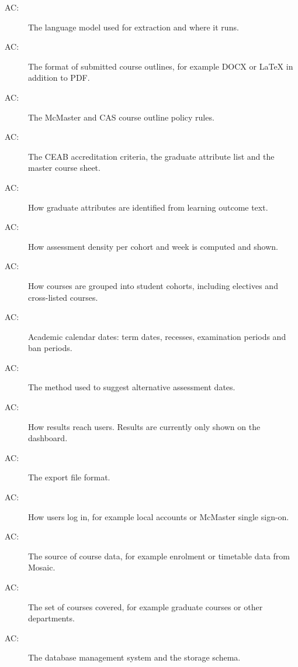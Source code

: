 \documentclass[12pt, titlepage]{article}
\newcounter{acnum}
\newcommand{\actheacnum}{AC\theacnum}
\begin{document}
\begin{description}
\item[ \actheacnum \label{acLLM}:] The language model
  used for extraction and where it runs.
\item[ \actheacnum \label{acFormat}:] The format of
  submitted course outlines, for example DOCX or \LaTeX{} in addition to PDF.
\item[ \actheacnum \label{acPolicy}:] The McMaster and
  CAS course outline policy rules.
\item[ \actheacnum \label{acCEAB}:] The CEAB
  accreditation criteria, the graduate attribute list and the master course
  sheet.
\item[ \actheacnum \label{acGA}:] How graduate
  attributes are identified from learning outcome text.
\item[ \actheacnum \label{acDensity}:] How assessment
  density per cohort and week is computed and shown.
\item[ \actheacnum \label{acCohort}:] How courses are
  grouped into student cohorts, including electives and cross-listed courses.
\item[ \actheacnum \label{acCalendar}:] Academic calendar
  dates: term dates, recesses, examination periods and ban periods.
\item[ \actheacnum \label{acSuggest}:] The method used to
  suggest alternative assessment dates.
\item[ \actheacnum \label{acNotify}:] How results reach
  users. Results are currently only shown on the dashboard.
\item[ \actheacnum \label{acExport}:] The export file
  format.
\item[ \actheacnum \label{acAuth}:] How users log in,
  for example local accounts or McMaster single sign-on.
\item[ \actheacnum \label{acSource}:] The source of
  course data, for example enrolment or timetable data from Mosaic.
\item[ \actheacnum \label{acScope}:] The set of courses
  covered, for example graduate courses or other departments.
\item[ \actheacnum \label{acDBMS}:] The database
  management system and the storage schema.

\end{description}
\end{document}
